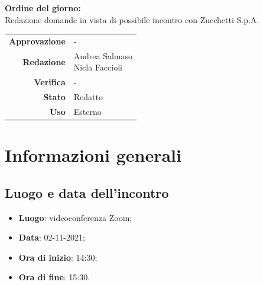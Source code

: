 \documentclass[11pt]{article}
\begin{document}
\begin{titlepage}
\begin{center}
			\large
			
			\vfill
			\textbf{Ordine del giorno:} \\
			Redazione domande in vista di possibile incontro con Zucchetti S.p.A.
			\vfill
			
			\begin{tabular}{r|l}
				\textbf{Approvazione} &  -\\
				\textbf{Redazione} &  \parbox[t]{3.5cm}{Andrea Salmaso \\Nicla Faccioli}\\
				\textbf{Verifica} &  -\\
				\textbf{Stato} & Redatto \\
				\textbf{Uso} & Esterno
			\end{tabular}
			\vfill
			
		\end{center}
	\end{titlepage}

	\newpage

	\section{Informazioni generali}
	\subsection{Luogo e data dell'incontro}
	\begin{itemize}
		\item \textbf{Luogo}: videoconferenza Zoom;
		\item \textbf{Data}: 02-11-2021;
		\item \textbf{Ora di inizio}: 14:30;
		\item \textbf{Ora di fine}: 15:30.
	\end{itemize}
	
\end{document}
